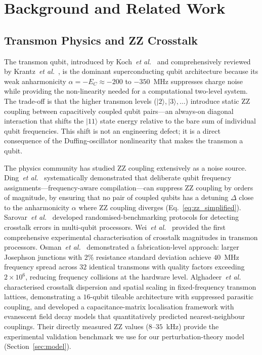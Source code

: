 \documentclass[ASNA,twocolumn]{USG}
\begin{document}
\section{Background and Related Work}
\label{sec:related}

\subsection{Transmon Physics and ZZ Crosstalk}

The transmon qubit, introduced by Koch~\emph{et al.}~\cite{koch2007transmon} and comprehensively reviewed by Krantz~\emph{et al.}~\cite{krantz2019guide}, is the dominant superconducting qubit architecture because its weak anharmonicity $\alpha = -E_C \approx -200$ to $-350$~MHz suppresses charge noise while providing the non-linearity needed for a computational two-level system. The trade-off is that the higher transmon levels ($|2\rangle, |3\rangle, \ldots$) introduce static ZZ coupling between capacitively coupled qubit pairs---an always-on diagonal interaction that shifts the $|11\rangle$ state energy relative to the bare sum of individual qubit frequencies. This shift is not an engineering defect; it is a direct consequence of the Duffing-oscillator nonlinearity that makes the transmon a qubit.

The physics community has studied ZZ coupling extensively as a noise source. Ding~\emph{et al.}~\cite{ding2020crosstalk} systematically demonstrated that deliberate qubit frequency assignments---frequency-aware compilation---can suppress ZZ coupling by orders of magnitude, by ensuring that no pair of coupled qubits has a detuning $\Delta$ close to the anharmonicity $\alpha$ where ZZ coupling diverges (Eq.~\ref{eq:zz_simplified}). Sarovar~\emph{et al.}~\cite{sarovar2020detecting} developed randomised-benchmarking protocols for detecting crosstalk errors in multi-qubit processors. Wei~\emph{et al.}~\cite{wei2022characterizing} provided the first comprehensive experimental characterisation of crosstalk magnitudes in transmon processors. Osman~\emph{et al.}~\cite{osman2023mitigation} demonstrated a fabrication-level approach: larger Josephson junctions with $2\%$ resistance standard deviation achieve $40$~MHz frequency spread across $32$ identical transmons with quality factors exceeding $2\times10^6$, reducing frequency collisions at the hardware level. Alghadeer~\emph{et al.}~\cite{alghadeer2025low,alghadeer2025crosstalk} characterised crosstalk dispersion and spatial scaling in fixed-frequency transmon lattices, demonstrating a $16$-qubit tileable architecture with suppressed parasitic coupling, and developed a capacitance-matrix localisation framework with evanescent field decay models that quantitatively predicted nearest-neighbour couplings. Their directly measured ZZ values ($8$--$35$~kHz) provide the experimental validation benchmark we use for our perturbation-theory model (Section~\ref{sec:model}).
\end{document}
